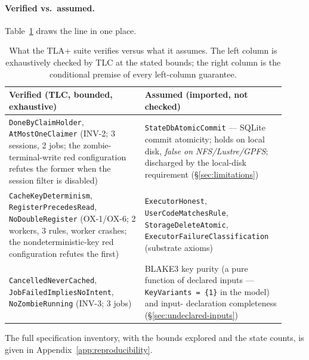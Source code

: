 \documentclass[12pt,a4paper]{article}
\newcommand{\code}[1]{{\texttt{\small\color{inlinecode}#1}}}
\begin{document}
\paragraph{Verified vs.\ assumed.}
Table~\ref{tab:verified-vs-assumed} draws the line in one place.

\begin{table}[htbp]
\centering\small
\begin{tabular}{@{}p{0.46\linewidth}p{0.46\linewidth}@{}}
\toprule
\textbf{Verified (TLC, bounded, exhaustive)} & \textbf{Assumed (imported, not checked)} \\
\midrule
\code{Done\allowbreak By\allowbreak Claim\allowbreak Holder},
  \code{At\allowbreak Most\allowbreak One\allowbreak Claimer}
  (INV-2; 3 sessions, 2 jobs; the zombie-terminal-write red
  configuration refutes the former when the session filter is
  disabled) &
\code{State\allowbreak Db\allowbreak Atomic\allowbreak Commit} --- SQLite commit atomicity;
  holds on local disk, \emph{false on NFS/Lustre/GPFS}; discharged by the
  local-disk requirement (\S\ref{sec:limitations}) \\
\addlinespace
\code{Cache\allowbreak Key\allowbreak Determinism},
  \code{Register\allowbreak Precedes\allowbreak Read},
  \code{No\allowbreak Double\allowbreak Register}
  (OX-1/OX-6; 2 workers, 3 rules, worker crashes; the
  nondeterministic-key red configuration refutes the first) &
\code{Executor\allowbreak Honest}, \code{User\allowbreak Code\allowbreak Matches\allowbreak Rule},
  \code{Storage\allowbreak Delete\allowbreak Atomic},
  \code{Executor\allowbreak Failure\allowbreak Classification}
  (substrate axioms) \\
\addlinespace
\code{Cancelled\allowbreak Never\allowbreak Cached},
  \code{Job\allowbreak Failed\allowbreak Implies\allowbreak No\allowbreak Intent},
  \code{No\allowbreak Zombie\allowbreak Running} (INV-3; 3 jobs) &
BLAKE3 key purity (a pure function of declared inputs ---
  \code{Key\allowbreak Variants = \{1\}} in the model) and input-%
declaration completeness (\S\ref{sec:undeclared-inputs}) \\
\bottomrule
\end{tabular}
\caption{What the TLA+ suite verifies versus what it assumes. The left
  column is exhaustively checked by TLC at the stated bounds; the right
  column is the conditional premise of every left-column guarantee.}
\label{tab:verified-vs-assumed}
\end{table}

The full specification inventory, with the bounds explored and the
state counts, is given in Appendix~\ref{app:reproducibility}.
\end{document}
